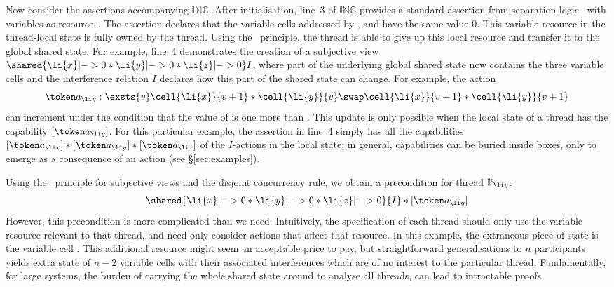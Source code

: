 %
%
Now consider the \colosl assertions accompanying  $\mathbb{INC}$.
After
initialisation, line~3 of $\mathbb{INC}$  provides a standard
assertion from separation logic~\cite{seplog} with variables as
resource~\cite{variablesAsResource}. The assertion  declares  that the variable cells
addressed by 
,
 and   have the same value  $0$. This variable resource in the thread-local state is
fully owned by  the thread. Using the \extendRule\ principle, the thread is able to give up  this local
resource and transfer it  to the global shared state. For example,
line~4 demonstrates the
creation of a subjective view $\shared{\li{x}|-> 0 * \li{y}|-> 0 * \li{z}|->
  0}I$, where {part} of the underlying
global shared state now contains the three variable  cells and the 
interference relation $I$ declares  how  this  part of the  shared state can change. For example,  the action 
  \vspace{-1ex}
\[
  \vspace{-1ex}
 \token a_{\li y}:  \exsts{v} \cell{\li{x}}{v+1} * \cell{\li{y}}{v} \swap 
 \cell{\li{x}}{v+1} * \cell{\li{y}}{v+1}
\]
can increment  under the condition that the
value of  is one more than . 
This update is only possible when the
local state of a thread has the { capability} $[\token a_{\li y}]$. For  this
particular 
example, the assertion in line~4 simply has all the capabilities $[\token
a_{\li x}] * [\token a_{\li y}] * [\token a_{\li z}]$ of the $I$-actions   in the local state; in general,
capabilities can be buried inside boxes, only to emerge as a
consequence of an action
(see \S\ref{sec:examples}). 



Using the 
\copyRule\ principle for subjective views and the disjoint concurrency
rule, we obtain a  precondition for thread $\mathbb{P}_{\li y}$:
  \vspace{-1ex}
\[
  \vspace{-1ex}
\shared{\li{x}|-> 0 * \li{y}|->0 * \li{z}|-> 0}{I} *[\token a_{\li y}]
\]
However, this precondition is more complicated than we
need. Intuitively, the specification of each thread should only use
the variable resource relevant to that thread, and need only consider actions
that affect that resource.  In this example, the extraneous piece of
state is the variable cell  . This additional resource  might seem an acceptable
price to pay, but straightforward generalisations to $n$ participants
yields extra state of $n-2$ variable cells with their associated
interferences which are of no interest to the particular thread.
Fundamentally, for large systems, the burden of carrying the whole
shared state around to analyse all threads,  can lead to intractable proofs.

